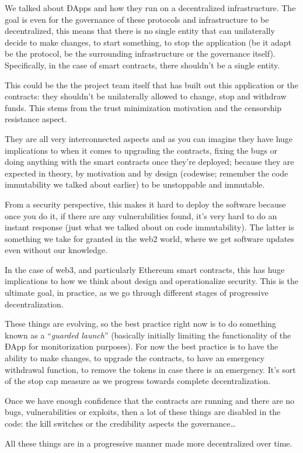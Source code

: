 We talked about ÐApps and how they run on a decentralized
infrastructure. The goal is even for the governance of these protocols
and infrastructure to be decentralized, this means that there is no
single entity that can unilaterally decide to make changes, to start
something, to stop the application (be it adapt be the protocol, be the
surrounding infrastructure or the governance itself). Specifically, in
the case of smart contracts, there shouldn't be a single entity.

This could be the the project team itself that has built out this
application or the contracts: they shouldn't be unilaterally allowed to
change, stop and withdraw funds. This stems from the trust minimization
motivation and the censorship resistance aspect.

They are all very interconnected aspects and as you can imagine they
have huge implications to when it comes to upgrading the contracts,
fixing the bugs or doing anything with the smart contracts once they're
deployed; because they are expected in theory, by motivation and by
design (codewise; remember the code immutability we talked about
earlier) to be unstoppable and immutable.

From a security perspective, this makes it hard to deploy the software
because once you do it, if there are any vulnerabilities found, it's
very hard to do an instant response (just what we talked about on code
immutability). The latter is something we take for granted in the web2
world, where we get software updates even without our knowledge.

In the case of web3, and particularly Ethereum smart contracts, this has
huge implications to how we think about design and operationalize
security. This is the ultimate goal, in practice, as we go through
different stages of progressive decentralization.

These things are evolving, so the best practice right now is to do
something known as a ``\emph{guarded launch}'' (basically initially
limiting the functionality of the ÐApp for monitorization purposes). For
now the best practice is to have the ability to make changes, to upgrade
the contracts, to have an emergency withdrawal function, to remove the
tokens in case there is an emergency. It's sort of the stop cap measure
as we progress towards complete decentralization.

Once we have enough confidence that the contracts are running and there
are no bugs, vulnerabilities or exploits, then a lot of these things are
disabled in the code: the kill switches or the credibility aspects the
governance\ldots{}

All these things are in a progressive manner made more decentralized
over time.

